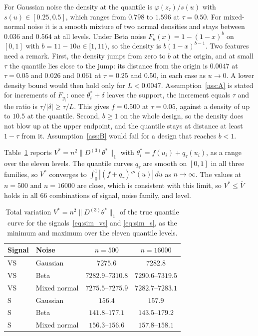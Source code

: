 For Gaussian noise the density at the quantile is $\varphi(z_\tau)/s(u)$ with $s(u)\in[0.25,0.5]$, which ranges from $0.798$ to $1.596$ at $\tau=0.50$. For mixed-normal noise it is a smooth mixture of two normal densities and stays between $0.036$ and $0.564$ at all levels. Under Beta noise $F_u(x)=1-(1-x)^{b}$ on $[0,1]$ with $b=11-10u\in[1,11)$, so the density is $b(1-x)^{b-1}$. Two features need a remark. First, the density jumps from zero to $b$ at the origin, and at small $\tau$ the quantile lies close to the jump: its distance from the origin is $0.0047$ at $\tau=0.05$ and $0.026$ and $0.061$ at $\tau=0.25$ and $0.50$, in each case as $u\to0$. A lower density bound would then hold only for $L<0.0047$. Assumption~\ref{ass:A} is stated for increments of $F_{y_i}$: once $\theta^*_i+\delta$ leaves the support, the increment equals $\tau$ and the ratio is $\tau/|\delta|\ge\tau/L$. This gives $\underline f=0.500$ at $\tau=0.05$, against a density of up to $10.5$ at the quantile. Second, $b\ge1$ on the whole design, so the density does not blow up at the upper endpoint, and the quantile stays at distance at least $1-\tau$ from it. Assumption~\ref{ass:B} would fail for a design that reaches $b<1$.

Table~\ref{tab:ass:tv} reports $V^*=n^2\|D^{(3)}\theta^*\|_1$ with $\theta^*_i=f(u_i)+q_\tau(u_i)$, as a range over the eleven levels. The quantile curves $q_\tau$ are smooth on $[0,1]$ in all three families, so $V^*$ converges to $\int_0^1|(f+q_\tau)'''(u)|\,du$ as $n\to\infty$. The values at $n=500$ and $n=16000$ are close, which is consistent with this limit, so $V^*\le\bar V$ holds in all $66$ combinations of signal, noise family, and level.

\begin{table}[t]
\centering
\caption{Total variation $V^*=n^2\|D^{(3)}\theta^*\|_1$ of the true quantile curve for the signals~\eqref{eq:sim_vs} and \eqref{eq:sim_s}, as the minimum and maximum over the eleven quantile levels.}
\label{tab:ass:tv}
\begin{tabular}{llcc}
\toprule
Signal & Noise & $n=500$ & $n=16000$\\
\midrule
VS & Gaussian & $7275.6$ & $7282.8$\\
VS & Beta & $7282.9$--$7310.8$ & $7290.6$--$7319.5$\\
VS & Mixed normal & $7275.5$--$7275.9$ & $7282.7$--$7283.1$\\
S & Gaussian & $156.4$ & $157.9$\\
S & Beta & $141.8$--$177.1$ & $143.5$--$179.2$\\
S & Mixed normal & $156.3$--$156.6$ & $157.8$--$158.1$\\
\bottomrule
\end{tabular}
\end{table}

